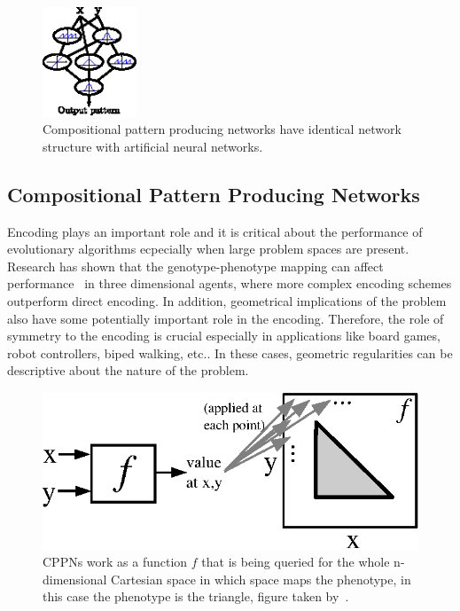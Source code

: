 \begin{figure}[t!]
\centering
\includegraphics[width=0.25\textwidth]{../Figures/Misc/cppnNetwork.eps}
\caption{Compositional pattern producing networks have identical network structure with artificial neural networks.}
\label{fig:cppnNetwork}
\end{figure}



\subsection{Compositional Pattern Producing Networks}
\label{CPPN}

Encoding plays an important role and it is critical about the performance of evolutionary algorithms ecpecially when large problem spaces are present. Research has shown that the genotype-phenotype mapping can affect performance~\citep{komosinski2001comparison} in three dimensional agents, where more complex encoding schemes outperform direct encoding. In addition, geometrical implications of the problem also have some potentially important role in the encoding. Therefore, the role of symmetry to the encoding is crucial especially in applications like board games, robot controllers, biped walking, etc.. In these cases, geometric regularities can be descriptive about the nature of the problem.

\begin{figure}[t!]
\centering
\includegraphics{../Figures/Misc/cppnResolution.eps}
\caption{CPPNs work as a function $f$ that is being queried for the whole n-dimensional Cartesian space in which space maps the phenotype, in this case the phenotype is the triangle, figure taken by~\citep{stanley2007compositional}.}
\label{fig:cppnResolution}
\end{figure}

